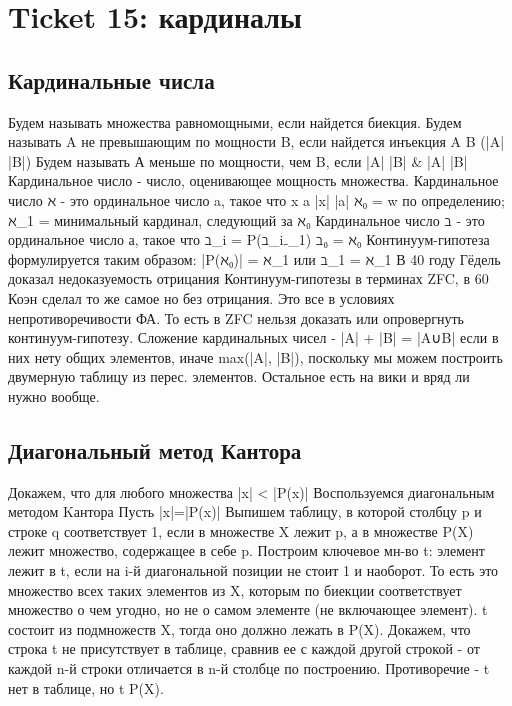 \section{Ticket 15: кардиналы}
\label{sec-17}
\subsection{Кардинальные числа}
\label{sec-17-1}
Будем называть множества равномощными, если найдется биекция.
Будем называть A не превышающим по мощности B, если найдется
инъекция A \to B (|A| \le |B|)
Будем называть А меньше по мощности, чем B, если |A| \le |B| \& |A| \ne  |B|
Кардинальное число - число, оценивающее мощность множества.
Кардинальное число ℵ - это ординальное число a, такое что
\forall  x \le a |x| \le |a|
ℵ₀ = w по определению; ℵ_1 = минимальный кардинал, следующий за ℵ₀
Кардинальное число ℶ - это ординальное число а, такое что
ℶ_i = P(ℶ_i₋_1)
ℶ₀ = ℵ₀
Континуум-гипотеза формулируется таким образом: |P(ℵ₀)| = ℵ_1 или ℶ_1 = ℵ_1
В 40 году Гёдель доказал недоказуемость отрицания Континуум-гипотезы
в терминах ZFC, в 60 Коэн сделал то же самое но без отрицания. Это все
в условиях непротиворечивости ФА. То есть в ZFC нельзя доказать или
опровергнуть континуум-гипотезу.
Сложение кардинальных чисел - |A| + |B| = |A∪B| если в них
нету общих элементов, иначе max(|A|, |B|), поскольку мы можем
построить двумерную таблицу из перес. элементов.
Остальное есть на вики и вряд ли нужно вообще.
\subsection{Диагональный метод Кантора}
\label{sec-17-2}
Докажем, что для любого множества |x| < |P(x)|
Воспользуемся диагональным методом Kантора
Пусть |x|=|P(x)|
Выпишем таблицу, в которой  столбцу p и строке q соответствует
1, если в множестве X лежит p, а в множестве P(X) лежит
множество, содержащее в себе p. Построим ключевое мн-во t:
элемент лежит в t, если на i-й диагональной позиции не стоит 1
и наоборот. То есть это множество всех таких элементов из X,
которым по биекции соответствует множество о чем угодно, но не
о самом элементе (не включающее элемент).
t состоит из подмножеств X, тогда оно должно лежать в P(X).
Докажем, что строка t не присутствует в таблице, сравнив ее с
каждой другой строкой - от каждой n-й строки отличается в n-й
столбце по построению.
Противоречие - t нет в таблице, но t \in P(X).
